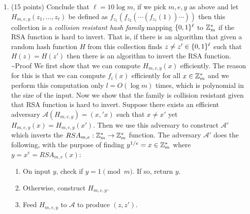 \documentclass{article}
\begin{document}
\begin{enumerate}
\begin{enumerate}[,label=\alph*.]
\item{}
(15 points) Conclude that $\ell = 10\log m$, if we pick $m,e,y$ as above and let $H_{m,e,y}(z_1,\ldots,z_\ell)$ be defined as $f_{z_1}(f_{z_2}(\cdots (f_{z_{\ell}}(1))\cdots))$ then this collection is a  \emph{collision resistant hash family} mapping $\{0,1\}^\ell$ to $\mathbb{Z}^*_m$ if the RSA function is hard to invert. That is, if there is an algorithm that given a random hash function $H$ from this collection finds $z\neq z' \in \{0,1\}^\ell$ such that $H(z)=H(z')$ then there is an algorithm to invert the RSA function.
\textasciitilde{}Proof
We first show that we can compute $H_{m,e,y}(x)$ efficiently. The reason for this is that we can
compute $f_i(x)$ efficiently for all $x \in \mathbb{Z}_m^*$ and we perform this computation only $l = O(\log m)$
times, which is polynomial in the size of the input. Now we show that the family is collision resistant
given that RSA function is hard to invert.
Suppose there exists an efficient adversary $\mathcal{A}(H_{m,e,y}) = (x,'x)$ such that $x \neq x'$
yet $H_{m,e,y}(x) = H_{m,e,y}(x')$. Then we use this adversary to construct $\mathcal{A'}$ which 
inverts the $RSA_{m,e}: \mathbb{Z}_m^* \to \mathbb{Z}_m^*$ function. The adversary $\mathcal{A'}$ does the following, 
with the purpose of finding $y^{1/e} = x \in \mathbb{Z}_m^*$ where $y = x^e = RSA_{m,e}(x)$:%

\begin{enumerate}[noitemsep,topsep=\mdcompacttopsep]%

\item{}On input $y$, check if $y = 1 \pmod m$. If so, return $y$.%

\item{}Otherwise, construct $H_{m,e,y}$.%

\item{}Feed $H_{m,e,y}$ to $\mathcal{A}$ to produce $(z,z')$.%


\end{enumerate}
\end{enumerate}
\end{enumerate}
\end{document}

